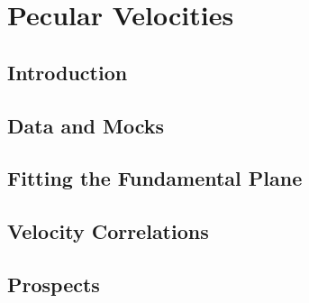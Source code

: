 \chapter{Pecular Velocities}

\label{chap:flow}

  
 

\section{Introduction}


\section{Data and Mocks}
\label{flow_s:data}

\section{Fitting the Fundamental Plane}

\section{Velocity Correlations}

\section{Prospects}

